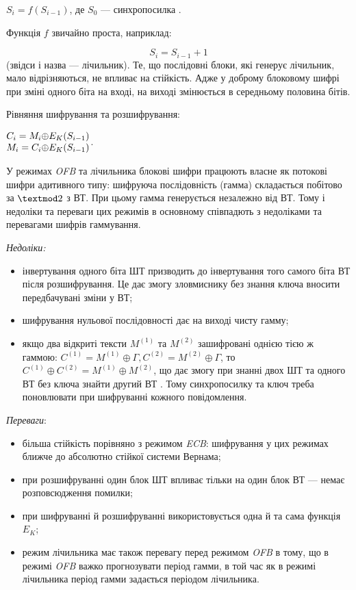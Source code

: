 {\centering
 $S_{i}=f(S_{i-1})$, де  $S_0$ --- синхропосилка .
\par}

Функція  $f$ звичайно проста, наприклад:

\begin{equation*}
{S_{i}=S_{i-1}+1}
\end{equation*}
(звідси і назва --- лічильник). Те, що послідовні блоки, які генерує лічильник,
мало відрізняються, не впливає на стійкість. Адже у доброму блоковому шифрі при
зміні одного біта на вході, на виході змінюється в середньому половина бітів.

Рівняння шифрування та розшифрування:

{\centering
 $\begin{matrix}{C_{i}=M_{i}{\oplus}E_{K}(S_{i-1})}\hfill\null
\\M_{i}=C_{i}{\oplus}E_{K}(S_{i-1})\hfill\null \end{matrix}\hfill $.
\par}

У режимах \textit{OFB}\textit{ }та лічильника блокові шифри працюють власне як
потокові шифри адитивного типу: шифруюча послідовність (гамма) складається
побітово за  $\textmod2$ з ВТ. При цьому гамма генерується незалежно від
ВТ. Тому і недоліки та переваги цих режимів в основному співпадють з недоліками
та перевагами шифрів гаммування.

{\itshape
Недоліки:}

\liststyleWWviiiNumxliv
\begin{itemize}
\item інвертування одного біта ШТ призводить до інвертування того самого біта ВТ
після розшифрування. Це дає змогу зловмиснику без знання ключа вносити
передбачувані зміни у ВТ;
\item шифрування нульової послідовності дає на виході чисту гамму;
\item якщо два відкриті тексти  $M^{(1)}$ та  $M^{(2)}$ зашифровані
однією тією ж гаммою:  ${C^{(1)}=M^{(1)}{\oplus}\Gamma
,C^{(2)}=M^{(2)}{\oplus}\Gamma }$, то 
$C^{(1)}{\oplus}C^{(2)}=M^{(1)}{\oplus}M^{(2)}$, що дає змогу при
знанні двох ШТ та одного ВТ без ключа знайти другий ВТ . Тому синхропосилку та
ключ треба поновлювати при шифруванні кожного повідомлення.
\end{itemize}
\textit{Переваги}:

\liststyleWWviiiNumxxvii
\begin{itemize}
\item більша стійкість порівняно з режимом \textit{ECB}: шифрування у цих
режимах ближче до абсолютно стійкої системи Вернама;
\item при розшифруванні один блок ШТ впливає тільки на один блок ВТ --- немає
розповсюдження помилки;
\item при шифруванні й розшифруванні використовується одна й та сама функція 
$E_K$;
\item режим лічильника має також перевагу перед режимом \textit{OFB} в тому, що
в режимі \textit{OFB}\textit{ }важко прогнозувати період гамми, в той час як в
режимі лічильника період гамми задається періодом лічильника.
\end{itemize}

